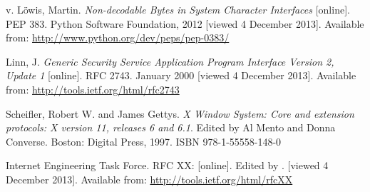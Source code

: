 \begin{thebibliography}{99}
	{\sc v. Löwis,} Martin.
	\emph{Non-decodable Bytes in System Character Interfaces}
	[online].
	PEP 383.
	Python Software Foundation, 2012 [viewed 4 December 2013].
	Available from: \url{http://www.python.org/dev/peps/pep-0383/}

	{\sc Linn,} J.
	\emph{Generic Security Service Application Program Interface Version 2, Update 1}
	[online].
	RFC 2743.
	January 2000 [viewed 4 December 2013].
	Available from: \url{http://tools.ietf.org/html/rfc2743}

	{\sc Scheifler,} Robert W. and James {\sc Gettys}.
	\emph{X Window System: Core and extension protocols: X version 11, releases 6 and 6.1}.
	Edited by Al Mento and Donna Converse.
	Boston: Digital Press, 1997.
	ISBN 978-1-55558-148-0

	{\sc Internet Engineering Task Force}.
	RFC XX:
	\emph{}
	[online].
	Edited by .
	 [viewed 4 December 2013].
	Available from: \url{http://tools.ietf.org/html/rfcXX}


\end{thebibliography}
